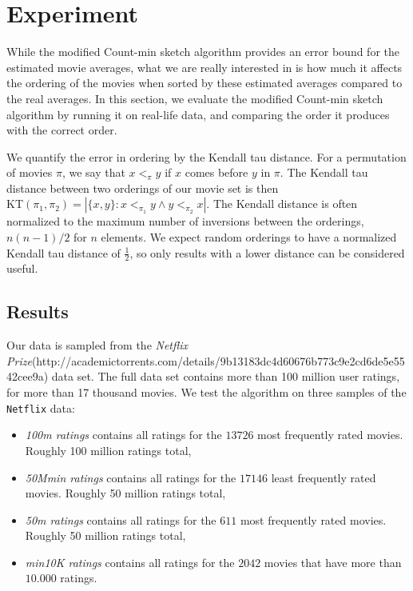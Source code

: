 \section{Experiment}
While the modified Count-min sketch algorithm provides an error bound for the
estimated movie averages, what we are really interested in is how much it
affects the ordering of the movies when sorted by these estimated averages
compared to the real averages. In this section, we evaluate the modified
Count-min sketch algorithm by running it on real-life data, and comparing the
order it produces with the correct order. 

We quantify the error in ordering by the Kendall tau distance. For a permutation
of movies $\pi$, we say that $x <_\pi y$ if $x$ comes before $y$ in $\pi$. The
Kendall tau distance between two orderings of our movie set is then $\mathrm{KT}
\left(\pi_1,\pi_2\right) = \left|\{x,y\}: x <_{\pi_1} y \wedge y <_{\pi_2}
x\right|$. The Kendall distance is often normalized to the maximum number of
inversions between the orderings, $n(n-1)/2$ for $n$ elements. We expect random
orderings to have a normalized Kendall tau distance of $\frac{1}{2}$, so
only results with a lower distance can be considered useful.

\subsection{Results}
Our data is sampled from the \textit{Netflix
Prize}(http://academictorrents.com/details/9b13183dc4d60676b773c9e2cd6de5e5542cee9a) data set.
The full data set contains more than 100 million user ratings, for more than 17
thousand movies.
We test the algorithm on three samples of the \texttt{Netflix} data:
\begin{itemize}
	\item \textit{100m ratings} contains all ratings for the $13726$ most
		frequently rated movies. Roughly 100 million ratings total,
	\item \textit{50Mmin ratings} contains all ratings for the $17146$ least
		frequently rated movies. Roughly 50 million ratings total,
	\item \textit{50m ratings} contains all ratings for the $611$ most
		frequently rated movies. Roughly 50 million ratings total,
	\item \textit{min10K ratings} contains all ratings for the $2042$ movies that have more
		than $10.000$ ratings.

\end{itemize}

